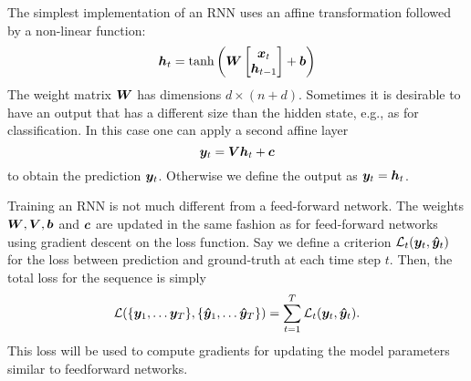 		The simplest implementation of an RNN uses an affine transformation followed by a non-linear function:
		\begin{equation}
			\bm{h}_t = 
			\tanh \left(
			\bm{W}
			\begin{bmatrix}
				\bm{x}_t \\
				\bm{h}_{t-1}
			\end{bmatrix}
			+ \bm{b}
			\right)
		\end{equation}
		The weight matrix $\bm{W}$ has dimensions $d \times (n + d)$.
		Sometimes it is desirable to have an output that has a different size than the hidden state, e.g., as for classification.
		In this case one can apply a second affine layer
		\begin{equation}
			\bm{y}_t = \bm{V} \bm{h}_t + \bm{c}
		\end{equation}
		to obtain the prediction $\bm{y}_t$.
		Otherwise we define the output as $\bm{y}_t = \bm{h}_t$.
		
		Training an RNN is not much different from a feed-forward network.
		The weights $\bm{W}, \bm{V}, \bm{b}$ and $\bm{c}$ are updated in the same fashion as for feed-forward networks using gradient descent on the loss function.
		Say we define a criterion $\mathcal{L}_t(\bm{y}_t, \bm{\hat{y}}_t)$ for the loss between prediction and ground-truth at each time step $t$.
		Then, the total loss for the sequence is simply 
		\begin{equation}\label{eq:loss_for_rnn}
			\mathcal{L}(\{\vectr{y}_1, \dots \vectr{y}_T\}, \{\vectr{\hat{y}}_1, \dots \vectr{\hat{y}}_T\}) = 
			\sum_{t=1}^{T} \mathcal{L}_t(\vectr{y}_t, \vectr{\hat{y}}_t).
		\end{equation}
		This loss will be used to compute gradients for updating the model parameters similar to feedforward networks.
		
